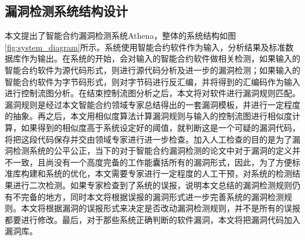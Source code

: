 \subsection{漏洞检测系统结构设计}
本文提出了智能合约漏洞检测系统Athena，整体的系统结构如图\ref{fig:system_diagram}所示。系统使用智能合约软件作为输入，分析结果及标准数据库作为输出。在系统的开始，会对输入的智能合约软件做相关检测，如果输入的智能合约软件为源代码形式，则进行源代码分析及进一步的漏洞检测；如果输入的智能合约软件为字节码形式，则对字节码进行反汇编，并将得到的汇编码作为输入进行控制流图分析。在结束控制流图分析之后，本文将对软件进行漏洞规则匹配。漏洞规则是经过本文智能合约领域专家总结得出的一套漏洞模板，并进行一定程度的抽象。再之后，本文用相似度算法计算漏洞规则与输入的控制流图进行相似度计算，如果得到的相似度高于系统设定好的阈值，就判断这是一个可疑的漏洞代码，将把这段代码保存并交由领域专家进行进一步检查。加入人工检查的目的是为了漏洞检测系统的公平公正，当下的对于智能合约漏洞检测的论文中对于漏洞的定义并不一致，且尚没有一个高度完备的工作能囊括所有的漏洞形式，因此，为了方便标准库构建和系统的优化，本文需要专家进行一定程度的人工干预，对系统的检测结果进行二次检测。如果专家检查到了系统的误报，说明本文总结的漏洞检测规则仍有不完备的地方，同时本文将根据误报的漏洞形式进一步完善系统的漏洞检测规则。本文将根据漏洞的误报形式来决定是否改动漏洞检测规则，并不是所有的误报都要进行修改。最后，对于那些系统正确判断的软件漏洞，本文将把漏洞代码加入漏洞库。
